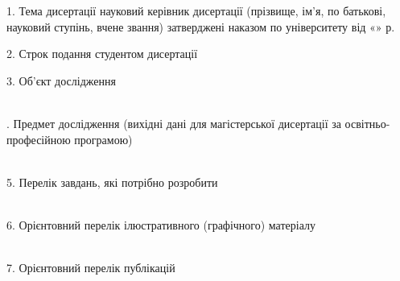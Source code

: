 \documentclass[]{lib/styles/additional-docs}
\begin{document}
  \vspace{0.5em}
  
  1. Тема дисертації 
  \leftAlignedWithCenterUnderlineSign
  { науковий керівник дисертації   }
  { (прізвище, ім’я, по батькові, науковий ступінь, вчене звання) }
  затверджені наказом по університету від «\uline{\hspace*{1.5em}}» \uline{\hspace*{5em}} \currentYear р.  \No{} \uline{\hspace*{2em}}
  
  \vspace{1em}

  2. Строк подання студентом дисертації \lineunderscore

  \vspace{1em}

  3. Об’єкт дослідження
  \\
  \lineunderscore\\
  \lineunderscore

  \vspace{1em}

  . Предмет дослідження (вихідні  дані  для  магістерської  дисертації  за освітньо-професійною  програмою)
  \\
  \lineunderscore\\
  \lineunderscore

  \clearpage
  \thispagestyle{empty}

  5. Перелік  завдань,  які  потрібно  розробити
   \\
  \lineunderscore\\
  \lineunderscore

  \vspace{1em}

  6. Орієнтовний  перелік  ілюстративного  (графічного)  матеріалу
   \\
  \lineunderscore\\
  \lineunderscore

  \vspace{1em}

  7. Орієнтовний перелік публікацій
   \\
  \lineunderscore\\
  \lineunderscore

  \vspace{1em}
  
\end{document}
